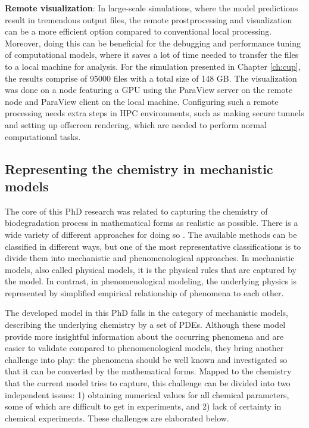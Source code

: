 \begin{itemize}
\textbf{Remote visualization}: In large-scale simulations, where the model predictions result in tremendous output files, the remote prostprocessing and visualization can be a more efficient option compared to conventional local processing. Moreover, doing this can be beneficial for the debugging and performance tuning of computational models, where it saves a lot of time needed to transfer the files to a local machine for analysis. For the simulation presented in Chapter \ref{ch:cup}, the results comprise of \num{95000} files with a total size of 148 GB. The visualization was done on a node featuring a GPU using the ParaView server on the remote node and ParaView client on the local machine. Configuring such a remote processing needs extra steps in HPC environments, such as making secure tunnels and setting up offscreen rendering, which are needed to perform normal computational tasks. 
\end{itemize}

\subsection{Representing the chemistry in mechanistic models} \label{sec:conclusion_mechanistic}


The core of this PhD research was related to capturing the chemistry of biodegradation process in mathematical forms as realistic as possible. There is a wide variety of different approaches for doing so \cite{Abdalla2020}. The available methods can be classified in different ways, but one of the most representative classifications is to divide them into mechanistic and phenomenological approaches. In mechanistic models, also called physical models, it is the physical rules that are captured by the model. In contrast, in phenomenological modeling, the underlying physics is represented by simplified empirical relationship of phenomena to each other. 

The developed model in this PhD falls in the category of mechanistic models, describing the underlying chemistry by a set of PDEs. Although these model provide more insightful information about the occurring phenomena and are easier to validate compared to phenomenological models, they bring another challenge into play: the phenomena should be well known and investigated so that it can be converted by the mathematical forms. Mapped to the chemistry that the current model tries to capture, this challenge can be divided into two independent issues: 1) obtaining numerical values for all chemical parameters, some of which are difficult to get in experiments, and 2) lack of certainty in chemical experiments. These challenges are elaborated below.

